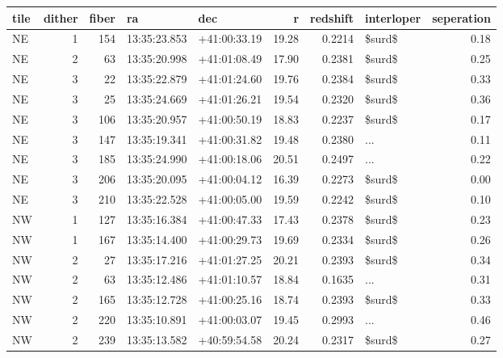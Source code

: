 \begin{tabular}{lrrllrrlr}
\toprule
tile &  dither &  fiber &            ra &           dec &      r &  redshift & interloper &  seperation \\
\midrule
  NE &       1 &    154 &  13:35:23.853 &  +41:00:33.19 &  19.28 &    0.2214 &     \$surd\$ &        0.18 \\
  NE &       2 &     63 &  13:35:20.998 &  +41:01:08.49 &  17.90 &    0.2381 &     \$surd\$ &        0.25 \\
  NE &       3 &     22 &  13:35:22.879 &  +41:01:24.60 &  19.76 &    0.2384 &     \$surd\$ &        0.33 \\
  NE &       3 &     25 &  13:35:24.669 &  +41:01:26.21 &  19.54 &    0.2320 &     \$surd\$ &        0.36 \\
  NE &       3 &    106 &  13:35:20.957 &  +41:00:50.19 &  18.83 &    0.2237 &     \$surd\$ &        0.17 \\
  NE &       3 &    147 &  13:35:19.341 &  +41:00:31.82 &  19.48 &    0.2380 &        ... &        0.11 \\
  NE &       3 &    185 &  13:35:24.990 &  +41:00:18.06 &  20.51 &    0.2497 &        ... &        0.22 \\
  NE &       3 &    206 &  13:35:20.095 &  +41:00:04.12 &  16.39 &    0.2273 &     \$surd\$ &        0.00 \\
  NE &       3 &    210 &  13:35:22.528 &  +41:00:05.00 &  19.59 &    0.2242 &     \$surd\$ &        0.10 \\
  NW &       1 &    127 &  13:35:16.384 &  +41:00:47.33 &  17.43 &    0.2378 &     \$surd\$ &        0.23 \\
  NW &       1 &    167 &  13:35:14.400 &  +41:00:29.73 &  19.69 &    0.2334 &     \$surd\$ &        0.26 \\
  NW &       2 &     27 &  13:35:17.216 &  +41:01:27.25 &  20.21 &    0.2393 &     \$surd\$ &        0.34 \\
  NW &       2 &     63 &  13:35:12.486 &  +41:01:10.57 &  18.84 &    0.1635 &        ... &        0.31 \\
  NW &       2 &    165 &  13:35:12.728 &  +41:00:25.16 &  18.74 &    0.2393 &     \$surd\$ &        0.33 \\
  NW &       2 &    220 &  13:35:10.891 &  +41:00:03.07 &  19.45 &    0.2993 &        ... &        0.46 \\
  NW &       2 &    239 &  13:35:13.582 &  +40:59:54.58 &  20.24 &    0.2317 &     \$surd\$ &        0.27 \\

\end{tabular}
